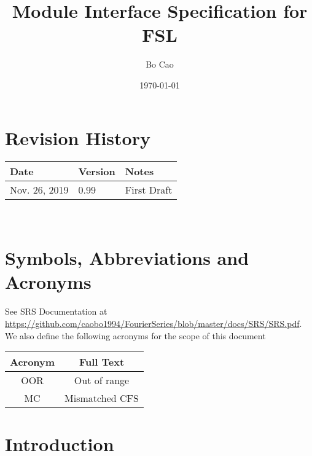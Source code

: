 \documentclass[12pt, titlepage]{article}
\begin{document}
\title{Module Interface Specification for FSL}

\author{Bo Cao}

\date{\today}

\maketitle



\section{Revision History}

\begin{tabularx}{\textwidth}{p{3cm}p{2cm}X}
\toprule {\bf Date} & {\bf Version} & {\bf Notes}\\
\midrule
Nov. 26, 2019 & 0.99 & First Draft\\
\bottomrule
\end{tabularx}

~\newpage

\section{Symbols, Abbreviations and Acronyms}

See SRS Documentation at \url{https://github.com/caobo1994/FourierSeries/blob/master/docs/SRS/SRS.pdf}.
We also define the following acronyms for the scope of this document
\begin{center}
	
\begin{tabular}{c c}
	\hline
	\textbf{Acronym} & \textbf{Full Text}\\
	\hline
	OOR & Out of range\\
	MC & Mismatched CFS\\
	\hline
\end{tabular}
\end{center}
\newpage

\tableofcontents

\newpage


\section{Introduction}
\end{document}

